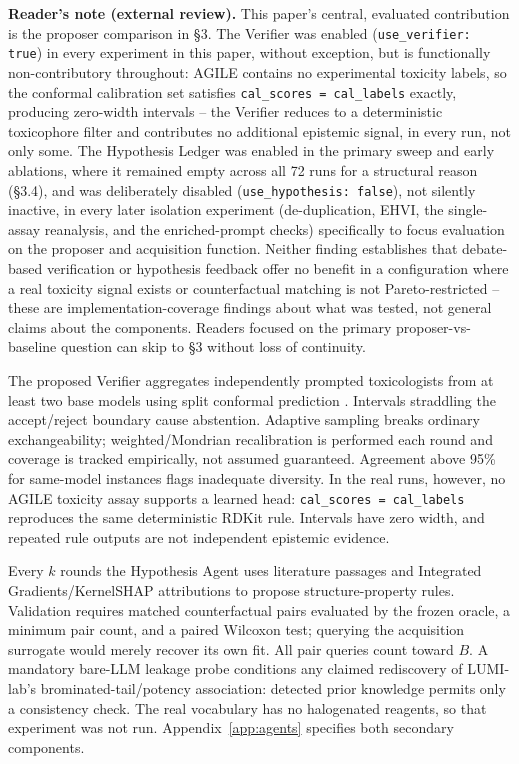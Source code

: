 \documentclass{article}
\begin{document}
\textbf{Reader's note (external review).} This paper's central, evaluated contribution is the proposer comparison in \S3. The Verifier was enabled (\texttt{use\_verifier: true}) in every experiment in this paper, without exception, but is functionally non-contributory throughout: AGILE contains no experimental toxicity labels, so the conformal calibration set satisfies \texttt{cal\_scores = cal\_labels} exactly, producing zero-width intervals -- the Verifier reduces to a deterministic toxicophore filter and contributes no additional epistemic signal, in every run, not only some. The Hypothesis Ledger was enabled in the primary sweep and early ablations, where it remained empty across all 72 runs for a structural reason (\S3.4), and was deliberately disabled (\texttt{use\_hypothesis: false}), not silently inactive, in every later isolation experiment (de-duplication, EHVI, the single-assay reanalysis, and the enriched-prompt checks) specifically to focus evaluation on the proposer and acquisition function. Neither finding establishes that debate-based verification or hypothesis feedback offer no benefit in a configuration where a real toxicity signal exists or counterfactual matching is not Pareto-restricted -- these are implementation-coverage findings about what was tested, not general claims about the components. Readers focused on the primary proposer-vs-baseline question can skip to \S3 without loss of continuity.

The proposed Verifier aggregates independently prompted toxicologists from at least two base models using split conformal prediction \citep{angelopoulos2023}. Intervals straddling the accept/reject boundary cause abstention. Adaptive sampling breaks ordinary exchangeability; weighted/Mondrian recalibration is performed each round and coverage is tracked empirically, not assumed guaranteed. Agreement above 95\% for same-model instances flags inadequate diversity. In the real runs, however, no AGILE toxicity assay supports a learned head: \texttt{cal\_scores = cal\_labels} reproduces the same deterministic RDKit rule. Intervals have zero width, and repeated rule outputs are not independent epistemic evidence.

Every $k$ rounds the Hypothesis Agent uses literature passages and Integrated Gradients/KernelSHAP attributions \citep{sundararajan2017,lundberg2017} to propose structure-property rules. Validation requires matched counterfactual pairs evaluated by the frozen oracle, a minimum pair count, and a paired Wilcoxon test; querying the acquisition surrogate would merely recover its own fit. All pair queries count toward $B$. A mandatory bare-LLM leakage probe conditions any claimed rediscovery of LUMI-lab's brominated-tail/potency association: detected prior knowledge permits only a consistency check. The real vocabulary has no halogenated reagents, so that experiment was not run. Appendix~\ref{app:agents} specifies both secondary components.
\end{document}

